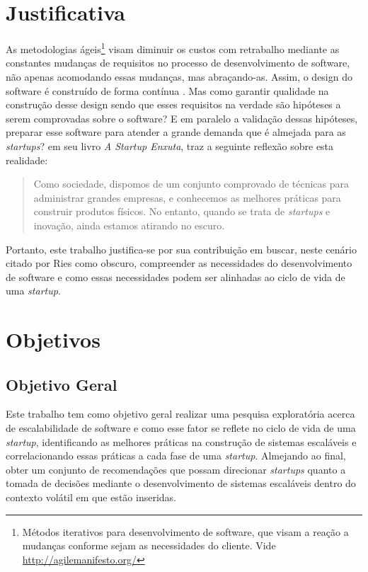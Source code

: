 \section{Justificativa}

As metodologias ágeis\footnote{Métodos iterativos para desenvolvimento de software,
que visam a reação a mudanças conforme sejam as necessidades do cliente. Vide
\url{http://agilemanifesto.org/}} visam diminuir os custos com retrabalho mediante as
constantes mudanças de requisitos no processo de desenvolvimento de software,
não apenas acomodando essas mudanças, mas abraçando-as. Assim, o design do
software é construído de forma contínua \cite{AgileSoftwareInnovation}.
Mas como garantir qualidade na construção desse design sendo que esses requisitos
na verdade são hipóteses a serem comprovadas sobre o software? E em paralelo
a validação dessas hipóteses, preparar esse software para atender a grande
demanda que é almejada para as \textit{startups}? 
em seu livro \textit{A Startup Enxuta}, traz a seguinte reflexão sobre esta
realidade:

  \begin{quotation}{}{}
    Como sociedade, dispomos de um conjunto comprovado de técnicas para
    administrar grandes empresas, e conhecemos as melhores práticas para
    construir produtos físicos. No entanto, quando se trata de \textit{startups}
    e inovação, ainda estamos atirando no escuro.
  \end{quotation}

Portanto, este trabalho justifica-se por sua contribuição em buscar, neste
cenário citado por Ries como obscuro, compreender as necessidades do desenvolvimento
de software e como essas necessidades podem ser alinhadas ao ciclo de vida de uma \textit{startup}.

\section{Objetivos}

\subsection{Objetivo Geral}
\label{sec:ObjetivoGeral}

Este trabalho tem como objetivo geral realizar uma pesquisa exploratória acerca de
escalabilidade de software e como esse fator se reflete no ciclo de vida de
uma \textit{startup}, identificando as melhores práticas na construção de sistemas escaláveis
e correlacionando essas práticas a cada fase de uma \textit{startup}.
Almejando ao final, obter um conjunto de recomendações que possam direcionar
\textit{startups} quanto a tomada de decisões mediante o desenvolvimento de sistemas escaláveis
dentro do contexto volátil em que estão inseridas.

